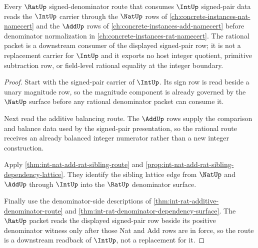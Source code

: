 \begin{theorem}
\label{thm:int-rat-sibling-lattice-readback}
Every $\RatUp$ signed-denominator route that consumes $\IntUp$ signed-pair data reads the $\IntUp$ carrier through the $\NatUp$ rows of \autoref{ch:concrete-instances-nat-namecert} and the $\AddUp$ rows of \autoref{ch:concrete-instances-add-namecert} before denominator normalization in \autoref{ch:concrete-instances-rat-namecert}. The rational packet is a downstream consumer of the displayed signed-pair row; it is not a replacement carrier for $\IntUp$ and it exports no host integer quotient, primitive subtraction row, or field-level rational equality at the integer boundary.
\end{theorem}
\begin{proof}
Start with the signed-pair carrier of $\IntUp$. Its sign row is read beside a unary magnitude row, so the magnitude component is already governed by the $\NatUp$ surface before any rational denominator packet can consume it.

Next read the additive balancing route. The $\AddUp$ rows supply the comparison and balance data used by the signed-pair presentation, so the rational route receives an already balanced integer numerator rather than a new integer construction.

Apply \autoref{thm:int-nat-add-rat-sibling-route} and \autoref{prop:int-nat-add-rat-sibling-dependency-lattice}. They identify the sibling lattice edge from $\NatUp$ and $\AddUp$ through $\IntUp$ into the $\RatUp$ denominator surface.

Finally use the denominator-side descriptions of \autoref{thm:int-rat-additive-denominator-route} and \autoref{thm:int-rat-denominator-dependency-surface}. The $\RatUp$ packet reads the displayed signed-pair row beside its positive denominator witness only after those Nat and Add rows are in force, so the route is a downstream readback of $\IntUp$, not a replacement for it.
\end{proof}
